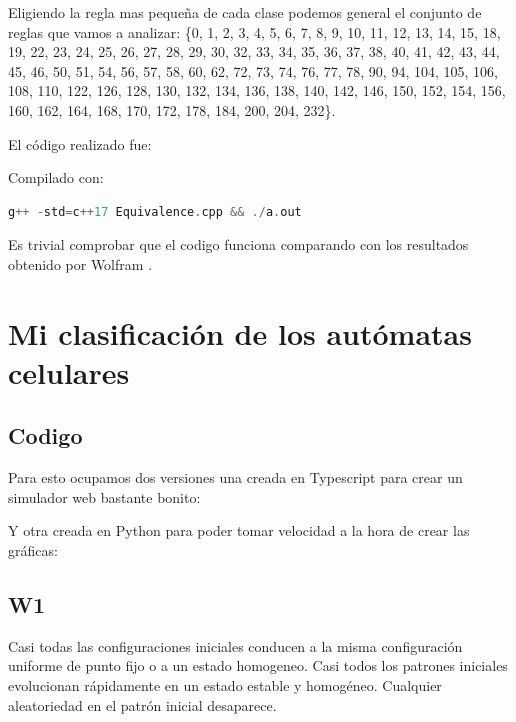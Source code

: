 \documentclass[12pt, fleqn]{report}                             %
\theoremstyle{break}                                            %
\begin{document}
      Eligiendo la regla mas pequeña de cada clase podemos general el conjunto de reglas que vamos a
      analizar: \{0, 1, 2, 3, 4, 5, 6, 7, 8, 9, 10, 11, 12, 13, 14, 15, 18, 19, 22, 23, 24, 25, 26, 27, 28, 29, 
      30, 32, 33, 34, 35, 36, 37, 38, 40, 41, 42, 43, 44, 45, 46, 50, 51, 54, 56, 57, 58, 60, 62, 72, 73, 
      74, 76, 77, 78, 90, 94, 104, 105, 106, 108, 110, 122, 126, 128, 130, 132, 134, 136, 138, 140, 142, 
      146, 150, 152, 154, 156, 160, 162, 164, 168, 170, 172, 178, 184, 200, 204, 232\}.

      El código realizado fue:
      

      Compilado con:
      \begin{lstlisting}[language=C++, gobble=6]
        g++ -std=c++17 Equivalence.cpp && ./a.out
      \end{lstlisting}

      Es trivial comprobar que el codigo funciona comparando con los resultados
      obtenido por Wolfram \cite{Wolfram}.

  \chapter{Mi clasificación de los autómatas celulares}
      \section{Codigo}

        Para esto ocupamos dos versiones una creada en Typescript para crear un simulador
        web bastante bonito:
        

        Y otra creada en Python para poder tomar velocidad a la hora de crear las gráficas:
        

      \clearpage


      \clearpage
      \section{W1}

      Casi todas las configuraciones iniciales conducen a la misma configuración uniforme de punto fijo o a un 
      estado homogeneo. Casi todos los patrones iniciales evolucionan rápidamente en un estado estable 
      y homogéneo. Cualquier aleatoriedad en el patrón inicial desaparece.
\end{document}
